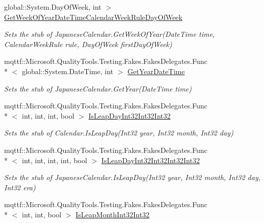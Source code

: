 \begin{DoxyCompactItemize}
global\-::\-System.\-Day\-Of\-Week, int $>$ \hyperlink{class_system_1_1_globalization_1_1_fakes_1_1_stub_japanese_calendar_a63f6e0121d4b1bb17a61fcbc84b6b928}{Get\-Week\-Of\-Year\-Date\-Time\-Calendar\-Week\-Rule\-Day\-Of\-Week}
\begin{DoxyCompactList}\small\item\em Sets the stub of Japanese\-Calendar.\-Get\-Week\-Of\-Year(\-Date\-Time time, Calendar\-Week\-Rule rule, Day\-Of\-Week first\-Day\-Of\-Week)\end{DoxyCompactList}\item 
mqttf\-::\-Microsoft.\-Quality\-Tools.\-Testing.\-Fakes.\-Fakes\-Delegates.\-Func\\*
$<$ global\-::\-System.\-Date\-Time, int $>$ \hyperlink{class_system_1_1_globalization_1_1_fakes_1_1_stub_japanese_calendar_a456806fcd5e0d934b79d5e83b7d19deb}{Get\-Year\-Date\-Time}
\begin{DoxyCompactList}\small\item\em Sets the stub of Japanese\-Calendar.\-Get\-Year(\-Date\-Time time)\end{DoxyCompactList}\item 
mqttf\-::\-Microsoft.\-Quality\-Tools.\-Testing.\-Fakes.\-Fakes\-Delegates.\-Func\\*
$<$ int, int, int, bool $>$ \hyperlink{class_system_1_1_globalization_1_1_fakes_1_1_stub_japanese_calendar_abdd5e9494a52dd9976411e0ba3555c73}{Is\-Leap\-Day\-Int32\-Int32\-Int32}
\begin{DoxyCompactList}\small\item\em Sets the stub of Calendar.\-Is\-Leap\-Day(\-Int32 year, Int32 month, Int32 day)\end{DoxyCompactList}\item 
mqttf\-::\-Microsoft.\-Quality\-Tools.\-Testing.\-Fakes.\-Fakes\-Delegates.\-Func\\*
$<$ int, int, int, int, bool $>$ \hyperlink{class_system_1_1_globalization_1_1_fakes_1_1_stub_japanese_calendar_a888ce1efbdca23c53fd5fa60f9382a2c}{Is\-Leap\-Day\-Int32\-Int32\-Int32\-Int32}
\begin{DoxyCompactList}\small\item\em Sets the stub of Japanese\-Calendar.\-Is\-Leap\-Day(\-Int32 year, Int32 month, Int32 day, Int32 era)\end{DoxyCompactList}\item 
mqttf\-::\-Microsoft.\-Quality\-Tools.\-Testing.\-Fakes.\-Fakes\-Delegates.\-Func\\*
$<$ int, int, bool $>$ \hyperlink{class_system_1_1_globalization_1_1_fakes_1_1_stub_japanese_calendar_afbcf74ee6431e073de34449b118b2b35}{Is\-Leap\-Month\-Int32\-Int32}

\end{DoxyCompactItemize}
